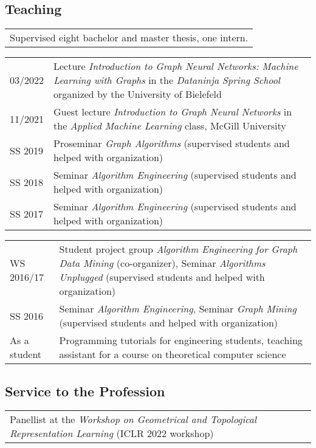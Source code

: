 \documentclass[11pt, a4paper, DIV=12]{scrartcl}
\begin{document}
\subsection*{Teaching}
\begin{tabular}{l}
Supervised eight bachelor and master thesis, one intern. \\[0.5em]
\end{tabular}

\begin{tabular}{p{2.1cm}p{12.0cm}}
03/2022	& Lecture \emph{Introduction to Graph Neural Networks: Machine Learning with Graphs} in the \emph{Dataninja Spring School} organized by the University of Bielefeld\\
11/2021 & Guest lecture \emph{Introduction to Graph Neural Networks} in the \emph{Applied Machine Learning} class, McGill University\\	
SS 2019&Proseminar \emph{Graph Algorithms} (supervised students and helped with organization)\\
SS 2018&Seminar \emph{Algorithm Engineering} (supervised students and helped with organization)\\
SS 2017&Seminar \emph{Algorithm Engineering} (supervised students and helped with organization)\\
\end{tabular}

\begin{tabular}{p{2.1cm}p{12.0cm}}
WS 2016/17&Student project group \emph{Algorithm Engineering for Graph Data Mining} (co-organizer), Seminar \emph{Algorithms Unplugged} (supervised students and helped with organization)\\
SS 2016& Seminar \emph{Algorithm Engineering}, Seminar \emph{Graph Mining} (supervised students and helped with organization)\\
As a student&Programming tutorials for engineering students, teaching assistant for a course on theoretical computer science\\
\end{tabular}

\subsection*{Service to the Profession}
\begin{tabular}{p{14.5cm}}	
	Panellist at the \emph{Workshop on
		Geometrical and Topological Representation Learning} (ICLR 2022 workshop) \\[0.5em]
\end{tabular}
\end{document}
